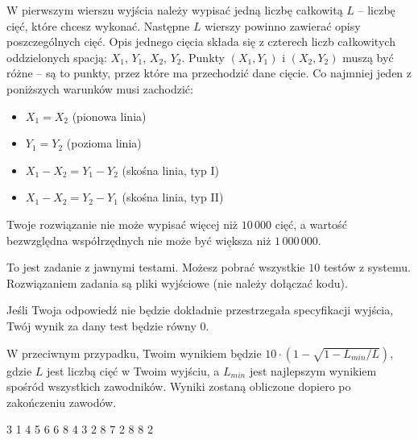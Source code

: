 W pierwszym wierszu wyjścia należy wypisać jedną liczbę całkowitą $L$ -- liczbę cięć, które chcesz wykonać.
Następne $L$ wierszy powinno zawierać opisy poszczególnych cięć.
Opis jednego cięcia składa się z czterech liczb całkowitych oddzielonych spacją: $X_1$, $Y_1$, $X_2$, $Y_2$.
Punkty $(X_1, Y_1)$ i $(X_2, Y_2)$ muszą być różne -- są to punkty, przez które ma przechodzić dane cięcie.
Co najmniej jeden z poniższych warunków musi zachodzić:
\begin{itemize}
	\item $X_1 = X_2$ (pionowa linia)
	\item $Y_1 = Y_2$ (pozioma linia)
	\item $X_1 - X_2 = Y_1 - Y_2$ (skośna linia, typ I)
	\item $X_1 - X_2 = Y_2 - Y_1$ (skośna linia, typ II)
\end{itemize}
Twoje rozwiązanie nie może wypisać więcej niż $10\,000$ cięć,
	a wartość bezwzględna współrzędnych nie może być większa niż $1\,000\,000$.


To jest zadanie z jawnymi testami.
Możesz pobrać wszystkie $10$ testów z systemu.
Rozwiązaniem zadania są pliki wyjściowe (nie należy dołączać kodu).

Jeśli Twoja odpowiedź nie będzie dokładnie przestrzegała specyfikacji wyjścia,
	Twój wynik za dany test będzie równy $0$.

W przeciwnym przypadku, Twoim wynikiem będzie $10 \cdot \left(1 - \sqrt{1 - L_{min} / L} \right)$,
	gdzie $L$ jest liczbą cięć w Twoim wyjściu, a $L_{min}$ jest najlepszym wynikiem spośród wszystkich zawodników.
Wyniki zostaną obliczone dopiero po zakończeniu zawodów.

\newpage


3 1
4 5
6 6
8 4
3 2 8 7
2 8 8 2
\sampleEND


